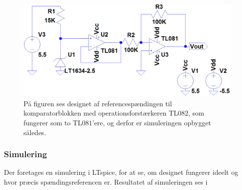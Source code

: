 \begin{figure}[H]
	\centering
	\includegraphics[scale=0.4]{figures/cProblemloesning/Reference_komparator.PNG}
	\caption{På figuren ses designet af referencespændingen til komparatorblokken med operationsforstærkeren TL$082$, som fungerer som to TL$081$'ere, og derfor er simuleringen opbygget således.}
	\label{fig:ref_komparator}
\end{figure}

\subsubsection{Simulering}
Der foretages en simulering i LTspice, for at se, om designet fungerer ideelt og hvor præcis spændingsreferencen er. Resultatet af simuleringen ses i 

